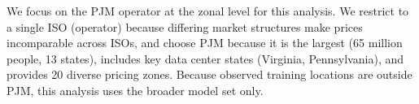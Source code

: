 \documentclass[a4paper,fleqn,longmktitle]{cas-sc}
\theoremstyle{plain}
\theoremstyle{definition}
\begin{document}
We focus on the PJM operator at the zonal level for this analysis. We restrict to a single ISO (operator) because differing market structures make prices incomparable across ISOs, and choose PJM because it is the largest (65 million people, 13 states), includes key data center states (Virginia, Pennsylvania), and provides 20 diverse pricing zones. Because observed training locations are outside PJM, this analysis uses the broader model set only.

\end{document}
